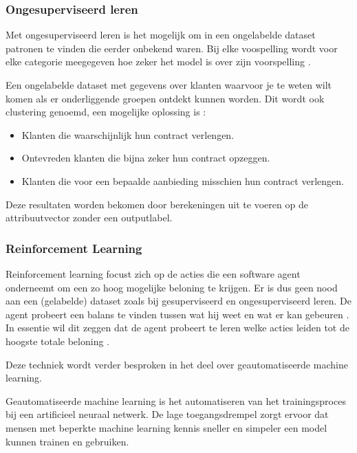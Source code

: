 \subsubsection{Ongesuperviseerd leren}
\label{subsubsec:ongesuperviseerd-leren}

Met ongesuperviseerd leren is het mogelijk om in een ongelabelde dataset patronen te vinden die eerder onbekend waren. Bij elke voospelling wordt voor elke categorie meegegeven hoe zeker het model is over zijn voorspelling \autocite{Hinton1999}.

Een ongelabelde dataset met gegevens over klanten waarvoor je te weten wilt komen als er onderliggende groepen ontdekt kunnen worden. Dit wordt ook clustering genoemd, een mogelijke oplossing is \autocite{Lievens2019}:

\begin{itemize}
    \item Klanten die waarschijnlijk hun contract verlengen.
    \item Ontevreden klanten die bijna zeker hun contract opzeggen.
    \item Klanten die voor een bepaalde aanbieding misschien hun contract verlengen.
\end{itemize}

Deze resultaten worden bekomen door berekeningen uit te voeren op de attribuutvector zonder een outputlabel.

\subsubsection{Reinforcement Learning}
\label{subsubsec:reinforcement-learning}

Reinforcement learning focust zich op de acties die een software agent onderneemt om een zo hoog mogelijke beloning te krijgen. Er is dus geen nood aan een (gelabelde) dataset zoals bij gesuperviseerd en ongesuperviseerd leren. De agent probeert een balans te vinden tussen wat hij weet en wat er kan gebeuren \autocite{Kaelbling1996}. In essentie wil dit zeggen dat de agent probeert te leren welke acties leiden tot de hoogste totale beloning \autocite{Lievens2019}.

Deze techniek wordt verder besproken in het deel over geautomatiseerde machine learning.


Geautomatiseerde machine learning is het automatiseren van het trainingsproces bij een artificieel neuraal netwerk. De lage toegangsdrempel zorgt ervoor dat mensen met beperkte machine learning kennis sneller en simpeler een model kunnen trainen en gebruiken.

